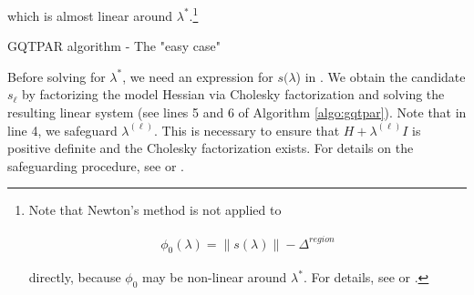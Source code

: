 \noindent which is almost linear around $\lambda^*$.\footnote{Note that Newton's method is not applied to

\begin{align}
    \phi_0 (\lambda) = \lVert s (\lambda) \rVert - \Delta^{region}
    \label{eq:root-finding}
\end{align}

\noindent directly, because $\phi_0$ may be non-linear around $\lambda^*$. For details, see \cite{More1983} or \cite{Nocedal2006}.}


\begin{algorithm}
    \caption{GQTPAR algorithm - The "easy case"} \label{algo:gqtpar}
                    \end{algorithm}

\noindent Before solving for $\lambda^*$, we need an expression for $s(\lambda$) in \label{eq:boundary-solution}. We obtain the candidate $s_\ell$ by factorizing the model Hessian via Cholesky factorization and solving the resulting linear system (see lines 5 and 6 of Algorithm \ref{algo:gqtpar}). Note that in line 4, we safeguard $\lambda^{(\ell)}$. This is necessary to ensure that $H + \lambda^{(\ell)} I$ is positive definite and the Cholesky factorization exists. For details on the safeguarding procedure, see \cite{More1983} or \cite{Nocedal2006}.


